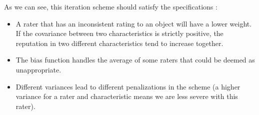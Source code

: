 As we can see, this iteration scheme should satisfy the specifications : 
\begin{itemize}
\item A rater that has an inconsistent rating to an object will have a lower weight. If the covariance between two characteristics is strictly positive, the reputation in two different characteristics tend to increase together.
\item The bias function handles the average of some raters that could be deemed as unappropriate.
\item Different variances lead to different penalizations in the scheme (a higher variance for a rater and characteristic means we are less severe with this rater).
\end{itemize}


